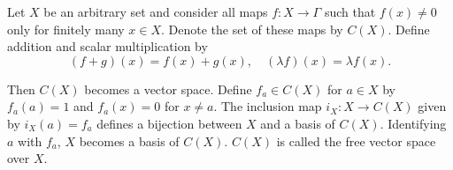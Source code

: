 Let $X$ be an arbitrary set and consider all maps $f: X \to \Gamma$ such that $f(x) \neq 0$ only for finitely many $x \in X$. Denote the set of these maps by $C(X)$. Define addition and scalar multiplication by
$$(f + g)(x) = f(x) + g(x), \quad (\lambda f)(x) = \lambda f(x).$$

Then $C(X)$ becomes a vector space. Define $f_a \in C(X)$ for $a \in X$ by $f_a(a) = 1$ and $f_a(x) = 0$ for $x \neq a$. The inclusion map $i_X: X \to C(X)$ given by $i_X(a) = f_a$ defines a bijection between $X$ and a basis of $C(X)$. Identifying $a$ with $f_a$, $X$ becomes a basis of $C(X)$. $C(X)$ is called the free vector space over $X$.
